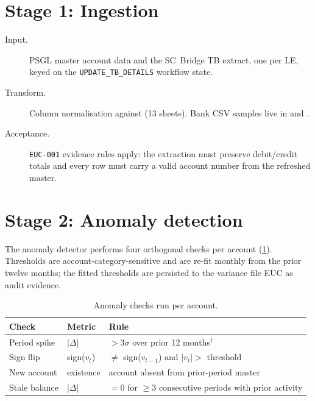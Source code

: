 \section{Stage 1: Ingestion}

\begin{description}
  \item[Input.] PSGL master account data and the SC~Bridge TB
        extract, one per LE, keyed on the \texttt{UPDATE\_TB\_DETAILS}
        workflow state.
  \item[Transform.] Column normalisation against
        (13 sheets). Bank CSV samples live in
         and
        .
  \item[Acceptance.] \texttt{EUC-001} evidence rules apply: the
        extraction must preserve debit/credit totals and every row
        must carry a valid account number from the refreshed master.
\end{description}

\section{Stage 2: Anomaly detection}

The anomaly detector performs four orthogonal checks per account
(\cref{tab:anomalies}). Thresholds are account-category-sensitive and
are re-fit monthly from the prior twelve months; the fitted thresholds
are persisted to the variance file EUC as audit evidence.

\begin{table}[htbp]
\caption{Anomaly checks run per account.}\label{tab:anomalies}
\centering
\small
\begin{tabularx}{\linewidth}{@{}llX@{}}
\toprule
\textbf{Check} & \textbf{Metric} & \textbf{Rule} \\ \midrule
Period spike   & $|\Delta|$       & $> 3\sigma$ over prior 12 months$^{\dagger}$ \\
Sign flip       & sign($v_t$)       & $\neq$ sign($v_{t-1}$) and $|v_t| > $ threshold \\
New account     & existence         & account absent from prior-period master \\
Stale balance   & $|\Delta|$        & $= 0$ for $\ge 3$ consecutive periods with prior activity \\
\bottomrule
\end{tabularx}
\end{table}

